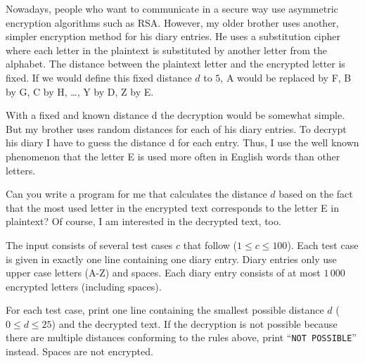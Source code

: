 Nowadays, people who want to communicate in a secure way use asymmetric encryption algorithms such as RSA.
However, my older brother uses another, simpler encryption method for his diary entries.
He uses a substitution cipher where each letter in the plaintext is substituted by another letter from the alphabet.
The distance between the plaintext letter and the encrypted letter is fixed.
If we would define this fixed distance $d$ to $5$, A would be replaced by F, B by G, C by H, \dots, Y by D, Z by E.

With a fixed and known distance d the decryption would be somewhat simple. But my brother uses random distances for each of his diary entries.
To decrypt his diary I have to guess the distance d for each entry.
Thus, I use the well known phenomenon that the letter E is used more often in English words than other letters.

Can you write a program for me that calculates the distance $d$ based on the fact that the most used letter in the encrypted text corresponds to the letter E in plaintext?
Of course, I am interested in the decrypted text, too.

\begin{Input}
    The input consists of several test cases $c$ that follow ($1 \leq c \leq 100$).
    Each test case is given in exactly one line containing one diary entry.
    Diary entries only use upper case letters (A-Z) and spaces.
    Each diary entry consists of at most $1\,000$ encrypted letters (including spaces).
\end{Input}

\begin{Output}
    For each test case, print one line containing the smallest possible distance $d$ ($0 \leq d \leq 25$) and the decrypted text.
    If the decryption is not possible because there are multiple distances conforming to the rules above, print ``\texttt{NOT POSSIBLE}'' instead.
    Spaces are not encrypted.
\end{Output}
